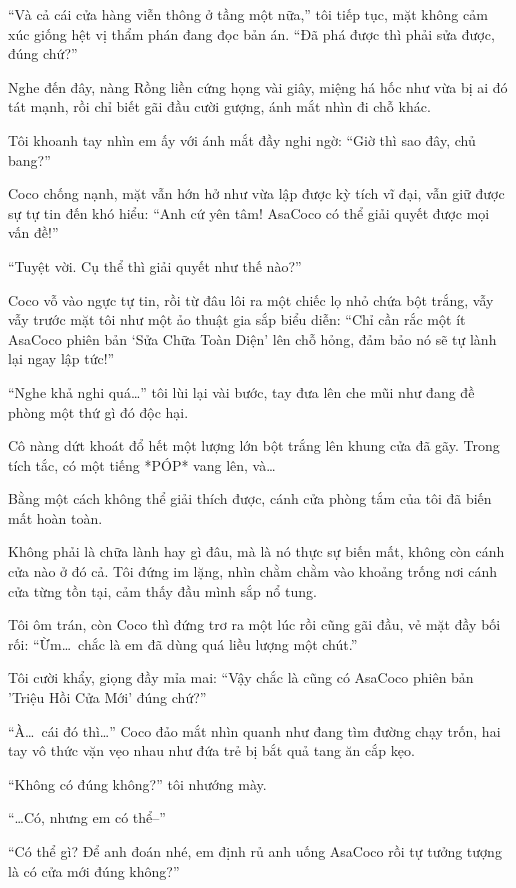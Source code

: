 \documentclass[../main.tex]{subfiles}
\begin{document}
``Và cả cái cửa hàng viễn thông ở tầng một nữa,'' tôi tiếp tục, mặt không cảm xúc giống hệt vị thẩm phán đang đọc bản án. ``Đã phá được thì phải sửa được, đúng chứ?''

Nghe đến đây, nàng Rồng liền cứng họng vài giây, miệng há hốc như vừa bị ai đó tát mạnh, rồi chỉ biết gãi đầu cười gượng, ánh mắt nhìn đi chỗ khác.

Tôi khoanh tay nhìn em ấy với ánh mắt đầy nghi ngờ: ``Giờ thì sao đây, chủ bang?''

Coco chống nạnh, mặt vẫn hớn hở như vừa lập được kỳ tích vĩ đại, vẫn giữ được sự tự tin đến khó hiểu: ``Anh cứ yên tâm! AsaCoco có thể giải quyết được mọi vấn đề!''

``Tuyệt vời. Cụ thể thì giải quyết như thế nào?''

Coco vỗ vào ngực tự tin, rồi từ đâu lôi ra một chiếc lọ nhỏ chứa bột trắng, vẫy vẫy trước mặt tôi như một ảo thuật gia sắp biểu diễn: ``Chỉ cần rắc một ít AsaCoco phiên bản `Sửa Chữa Toàn Diện' lên chỗ hỏng, đảm bảo nó sẽ tự lành lại ngay lập tức!''

``Nghe khả nghi quá\dots'' tôi lùi lại vài bước, tay đưa lên che mũi như đang đề phòng một thứ gì đó độc hại.

Cô nàng dứt khoát đổ hết một lượng lớn bột trắng lên khung cửa đã gãy. Trong tích tắc, có một tiếng *PÓP* vang lên, và\dots

Bằng một cách không thể giải thích được, cánh cửa phòng tắm của tôi đã biến mất hoàn toàn.

Không phải là chữa lành hay gì đâu, mà là nó thực sự biến mất, không còn cánh cửa nào ở đó cả. Tôi đứng im lặng, nhìn chằm chằm vào khoảng trống nơi cánh cửa từng tồn tại, cảm thấy đầu mình sắp nổ tung.

Tôi ôm trán, còn Coco thì đứng trơ ra một lúc rồi cũng gãi đầu, vẻ mặt đầy bối rối: ``Ừm\dots\ chắc là em đã dùng quá liều lượng một chút.''

Tôi cười khẩy, giọng đầy mỉa mai: ``Vậy chắc là cũng có AsaCoco phiên bản 'Triệu Hồi Cửa Mới' đúng chứ?''

``À\dots\ cái đó thì\dots'' Coco đảo mắt nhìn quanh như đang tìm đường chạy trốn, hai tay vô thức vặn vẹo nhau như đứa trẻ bị bắt quả tang ăn cắp kẹo.

``Không có đúng không?'' tôi nhướng mày.

``\dots Có, nhưng em có thể--''

``Có thể gì? Để anh đoán nhé, em định rủ anh uống AsaCoco rồi tự tưởng tượng là có cửa mới đúng không?''
\end{document}
